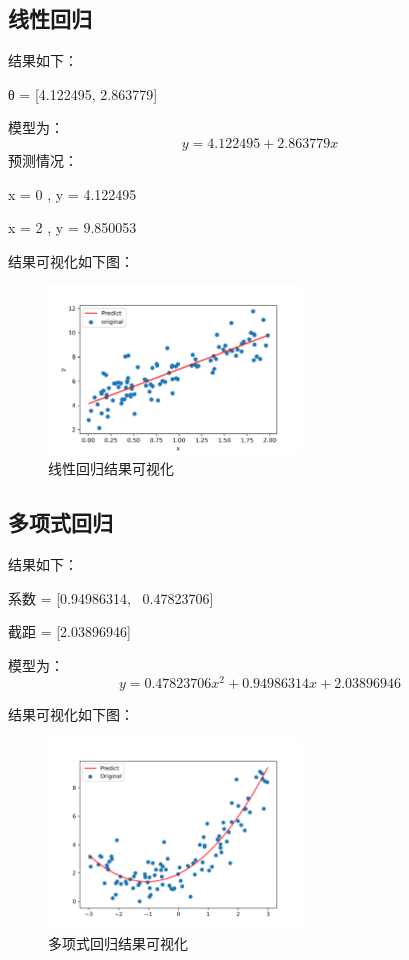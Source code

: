 \documentclass{../source/Experiment}
\begin{document}
\subsection{线性回归}

结果如下：

θ = [4.122495, 2.863779]

模型为：
$$ y = 4.122495 + 2.863779x$$
预测情况：

x = 0 , y = 4.122495

x = 2 , y = 9.850053


结果可视化如下图：
\begin{figure}[H]
    \centering
    \includegraphics[width = 0.6\textwidth]{Part2/figure1.png}
    \caption{线性回归结果可视化}
\end{figure}

\subsection{多项式回归}
结果如下：

系数 = [0.94986314, \, 0.47823706]

截距 = [2.03896946]

模型为：
$$ y = 0.47823706x^2 + 0.94986314x + 2.03896946$$

结果可视化如下图：
\begin{figure}[H]
    \centering
    \includegraphics[width = 0.6\textwidth]{Part2/figure2.png}
    \caption{多项式回归结果可视化}
\end{figure}
\end{document}
